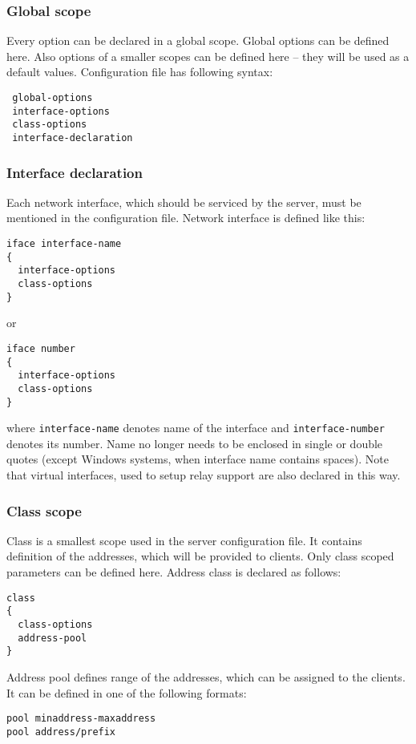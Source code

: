 \subsubsection{Global scope}

Every option can be declared in a global scope. Global options can be
defined here. Also options of a smaller scopes can be defined here --
they will be used as a default values. Configuration file has following syntax:

\begin{verbatim}
 global-options
 interface-options
 class-options          
 interface-declaration
\end{verbatim}

\subsubsection{Interface declaration}
Each network interface, which should be serviced by the server, must be
mentioned in the configuration file. Network interface is defined like this:
\begin{verbatim}
iface interface-name
{
  interface-options
  class-options        
}
\end{verbatim}

or 

\begin{verbatim}
iface number 
{
  interface-options
  class-options        
}
\end{verbatim}

where \verb+interface-name+ denotes name of the interface and
\verb+interface-number+ denotes its number. Name no longer needs to be
enclosed in single or double quotes (except Windows systems, when
interface name contains spaces). Note that virtual interfaces, used
to setup relay support are also declared in this way.

\subsubsection{Class scope}
Class is a smallest scope used in the server configuration file. It
contains definition of the addresses, which will be provided to
clients. Only class scoped parameters can be defined here. Address class
is declared as follows:
\begin{verbatim}
class
{  
  class-options
  address-pool    
}
\end{verbatim}

Address pool defines range of the addresses, which can be assigned to the
clients. It can be defined in one of the following formats:
\begin{verbatim}
pool minaddress-maxaddress
pool address/prefix
\end{verbatim}

